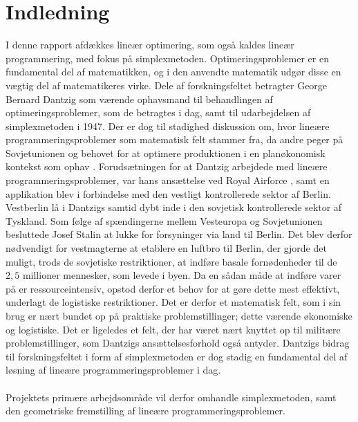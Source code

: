 \chapter{Indledning}
I denne rapport afdækkes lineær optimering, som også kaldes lineær programmering, med fokus på simplexmetoden.
Optimeringsproblemer er en fundamental del af matematikken, og i den anvendte matematik udgør disse en vægtig del af matematikeres virke. 
Dele af forskningsfeltet betragter George Bernard Dantzig som værende  ophavsmand til behandlingen af optimeringsproblemer, som de betragtes i dag, samt til udarbejdelsen af simplexmetoden \citep[side 107]{refa} i 1947.
Der er dog til stadighed diskussion om, hvor lineære programmeringsproblemer som matematisk felt stammer fra, da andre peger på Sovjetunionen og behovet for at optimere produktionen i en planøkonomisk kontekst som ophav \citep[side 155]{refb}.
Forudsætningen for at Dantzig arbejdede med lineære programmeringsproblemer, var hans ansættelse ved Royal Airforce \citep[side 107]{refa}, samt en applikation blev i forbindelse med den vestligt kontrollerede sektor af Berlin.
Vestberlin lå i Dantzigs samtid dybt inde i den sovjetisk kontrollerede sektor af Tyskland. 
Som følge af spændingerne mellem Vesteuropa og Sovjetunionen besluttede Josef Stalin at lukke for forsyninger via land til Berlin.
Det blev derfor nødvendigt for vestmagterne at etablere en luftbro til Berlin, der gjorde det muligt, trods de sovjetiske restriktioner, at indføre basale fornødenheder til de $2,5$ millioner mennesker, som levede i byen.
Da en sådan måde at indføre varer på er ressourceintensiv, opstod derfor et behov for at gøre dette mest effektivt, underlagt de logistiske restriktioner.
Det er derfor et matematisk felt, som i sin brug er nært bundet op på praktiske problemstillinger; dette værende økonomiske og logistiske.
Det er ligeledes et felt, der har været nært knyttet op til militære problemstillinger, som Dantzigs ansættelsesforhold også antyder.
Dantzigs bidrag til forskningsfeltet i form af simplexmetoden er dog stadig en fundamental del af løsning af lineære programmeringsproblemer i dag.
\\\\
Projektets primære arbejdsområde vil derfor omhandle simplexmetoden, samt den geometriske fremstilling af lineære programmeringsproblemer.
